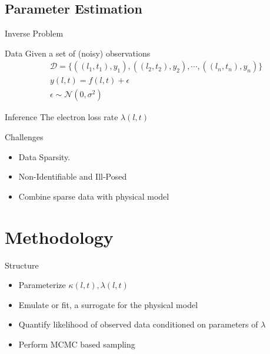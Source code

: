 \documentclass{beamer}
\begin{document}
\subsection{Parameter Estimation}

\begin{frame}{Inverse Problem}
  \begin{block}{Data}
    Given a set of (noisy) observations
    \begin{align*}
      & \mathcal{D} = \{ ((l_1, t_1), y_1), ((l_2, t_2), y_2),
                    \cdots, ((l_n, t_n), y_n) \} \\
      & y(l, t) = f(l, t) + \epsilon \\
      & \epsilon \sim \mathcal{N}(0, \sigma^2)
    \end{align*}
  \end{block}
  
  \begin{block}{Inference}
    The electron loss rate $\lambda(l, t)$
  \end{block}
\end{frame}

\begin{frame}{Challenges}
  \begin{itemize}
  \item<1->{
      Data Sparsity.
    }
  \item<2->{Non-Identifiable and Ill-Posed}
  \item<3->{Combine sparse data with physical model}
  \end{itemize}
\end{frame}


\section{Methodology}

\begin{frame}{Structure}
  \begin{itemize}
  \item<1->{
      Parameterize $\kappa(l, t), \lambda(l, t)$
    }
  \item<2->{Emulate or fit, a surrogate for the physical model}
  \item<3->{Quantify likelihood of observed data conditioned on
      parameters of $\lambda$}
  \item<4->{Perform MCMC based sampling}
  \end{itemize}
\end{frame}
\end{document}

